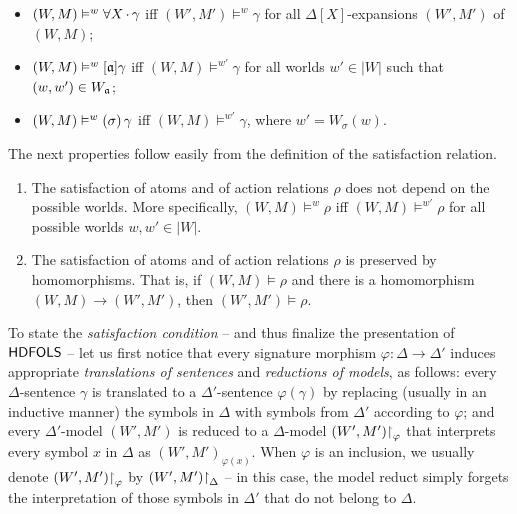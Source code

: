\documentclass[a4paper,UKenglish,cleveref,autoref]{lipics-v2019}
\begin{document}
\begin{enumerate}
\begin{itemize}
  \item \((W, M) \vDash^{w} \forall X\,{\cdot}\,{\gamma}\) iff \((W', M') \models^{w} \gamma\) for all \(\Delta[X]\)-expansions \((W', M')\) of \((W, M)\);

  \item \((W, M) \vDash^{w} [\mathfrak{a}] \gamma\) iff \((W, M) \models^{w'}\gamma\) for all worlds \(w' \in |W|\) such that \((w, w') \in W_{\mathfrak{a}}\);

  \item \((W, M) \vDash^{w} (\sigma)\, \gamma\) iff \((W, M) \models^{w'}\gamma\), where \(w' = W_{\sigma}(w)\).

  \end{itemize}

\end{enumerate}

\begin{fact}
  \label{fact:sat-atoms-actrel}
  The next properties follow easily from the definition of the satisfaction relation.
  \begin{enumerate}
    
  \item The satisfaction of atoms and of action relations \(\rho\) does not depend on the possible worlds.
    More specifically, \((W, M) \models^{w} \rho\) iff \((W, M) \models^{w'} \rho\) for all possible worlds \(w, w' \in |W|\).

  \item The satisfaction of atoms and of action relations \(\rho\) is preserved by homomorphisms.
    That is, if \((W, M) \models \rho\) and there is a homomorphism \((W, M) \to (W', M')\), then \((W', M') \models \rho\).
    
  \end{enumerate}
\end{fact}

To state the \emph{satisfaction condition} -- and thus finalize the presentation of \({\mathsf{HDFOLS}}\) -- let us first notice that every signature morphism \(\varphi \colon \Delta \to \Delta'\) induces appropriate \emph{translations of sentences} and \emph{reductions of models}, as follows:
every \(\Delta\)-sentence \(\gamma\) is translated to a \(\Delta'\)-sentence \(\varphi(\gamma)\) by replacing (usually in an inductive manner) the symbols in \(\Delta\) with symbols from \(\Delta'\) according to \(\varphi\);
and every \(\Delta'\)-model \((W', M')\) is reduced to a \(\Delta\)-model \((W', M') \mathord{\upharpoonright}_{\varphi}\) that interprets every symbol \(x\) in \(\Delta\) as \((W', M')_{\varphi(x)}\).
When \(\varphi\) is an inclusion, we usually denote \((W', M') \mathord{\upharpoonright}_{\varphi}\) by \((W', M') \mathord{\upharpoonright}_{\Delta}\) -- in this case, the model reduct simply forgets the interpretation of those symbols in \(\Delta'\) that do not belong to \(\Delta\).
\end{document}

